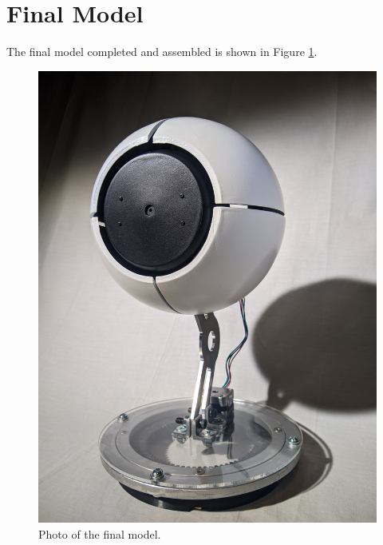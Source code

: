 \section{Final Model}
The final model completed and assembled is shown in Figure \ref{fig:final_model}.
\begin{figure}[h!]
    \centering
    \includegraphics[width=0.6\linewidth]{Thesis/best-view.jpg}
    \caption{Photo of the final model.}
    \label{fig:final_model}
\end{figure}